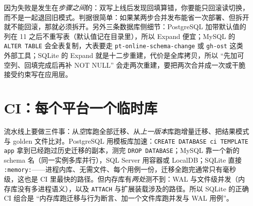 \documentclass[12pt,a4paper,fontset=fandol]{ctexbook}
\newcommand{\Tp}[1]{\texttt{#1}}
\begin{document}
\begin{warning}[title=为什么每一步必须能单独发布]
因为失败是发生在\emph{步骤之间}的：双写上线后发现回填算错，你要能只回滚读切换，而不是一起退回旧模式。判据很简单：如果某两步合并发布能省一次部署、但拆开就不能回滚，那就必须拆开。另外三条数据库侧细节：PostgreSQL 加带默认值的列在 11 之后不重写表（默认值记在目录里），所以 Expand 便宜；MySQL 的 \texttt{ALTER TABLE} 会全表复制，大表要走 \Tp{pt-online-schema-change} 或 \Tp{gh-ost} 这类外部工具；SQLite 的 Expand 就是十二步重建，代价是全库拷贝，所以 ``先加可空列、回填完成后再补 NOT NULL'' 会走两次重建，要把两次合并成一次或干脆接受约束写在应用层。
\end{warning}

\section{CI：每个平台一个临时库}

流水线上要做三件事：从\emph{空}库跑全部迁移、从\emph{上一版本}库跑增量迁移、把结果模式与 golden 文件比对。PostgreSQL 用模板库加速：\texttt{CREATE DATABASE ci TEMPLATE app} 拿到已经跑过历史迁移的副本，测完 \texttt{DROP DATABASE}；MySQL 靠一个新的 schema 名（同一实例多库并行），SQL Server 用容器或 LocalDB；SQLite 直接 \texttt{:memory:}——进程内库、无需文件、每个用例一份，迁移全跑完通常只有毫秒级，这也是 CI 里最快的路径。但内存库有\emph{两处}测不到：WAL 与文件级并发（内存库没有多进程语义），以及 \texttt{ATTACH} 与扩展装载涉及的路径。所以 SQLite 的正确 CI 组合是 ``内存库跑迁移与行为断言、加一个文件库跑并发与 WAL 用例''。
\end{document}

